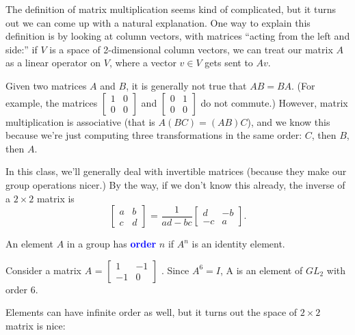 \documentclass[11pt]{article}
\begin{document}
The definition of matrix multiplication seems kind of complicated, but it turns
out we can come up with a natural explanation. One way to explain this
definition is by looking at column vectors, with matrices ``acting from the
left and side:'' if $V$ is a space of 2-dimensional column vectors, we can
treat our matrix $A$ as a linear operator on $V$, where a vector $v \in V$ gets
sent to $Av$.
\begin{fact}
    Given two matrices $A$ and $B$, it is generally not true that $AB = BA$. (For example, the matrices $\begin{bmatrix}
            1 & 0 \\
            0 & 0
        \end{bmatrix}$
    and $\begin{bmatrix}
            0 & 1 \\
            0 & 0\end{bmatrix}$ do not commute.) However, matrix multiplication is associative (that is $A(BC) = (AB)C$), and we know this because we're just computing three transformations in the same order: $C$, then $B$, then $A$.
\end{fact}

In this class, we'll generally deal with invertible matrices (because they make
our group operations nicer.) By the way, if we don't know this already, the
inverse of a $2 \times 2$ matrix is
\[
    \begin{bmatrix}
        a & b \\
        c & d
    \end{bmatrix} \text{ = } \frac{1}{ad - bc} \begin{bmatrix}
        d  & -b \\
        -c & a
    \end{bmatrix}.
\]

\begin{definition}
    An element $A$ in a group has \textcolor{blue}{\textbf{order}} $n$ if $A^n$ is an identity element.
\end{definition}

\begin{example}
    Consider a matrix $A$ = $
        \begin{bmatrix}
            1  & -1 \\
            -1 & 0
        \end{bmatrix}$
    . Since $A^6 = I$, A is an element of $GL_2$ with order 6.
\end{example}
Elements can have infinite order as well, but it turns out the space of $2 \times 2 $ matrix is nice:
\end{document}
